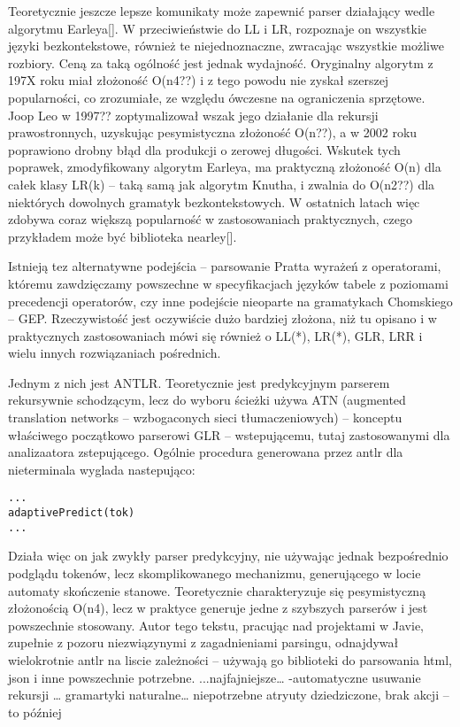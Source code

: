 Teoretycznie jeszcze lepsze komunikaty może zapewnić parser działający wedle algorytmu Earleya[]. W przeciwieństwie do LL i LR, rozpoznaje on wszystkie języki bezkontekstowe, również te niejednoznaczne, zwracając wszystkie możliwe rozbiory. Ceną za taką ogólność jest jednak wydajność. Oryginalny algorytm z 197X roku miał złożoność O(n4??) i z tego powodu nie zyskał szerszej popularności, co zrozumiałe, ze względu ówczesne na ograniczenia sprzętowe. Joop Leo w 1997?? zoptymalizował wszak jego działanie dla rekursji prawostronnych, uzyskując pesymistyczna złożoność O(n??), a w 2002 roku poprawiono drobny błąd dla produkcji o zerowej długości. Wskutek tych poprawek, zmodyfikowany algorytm Earleya, ma praktyczną złożoność O(n) dla całek klasy LR(k) – taką samą jak algorytm Knutha, i zwalnia do O(n2??) dla niektórych dowolnych gramatyk bezkontekstowych. W ostatnich latach więc zdobywa coraz większą popularność w zastosowaniach praktycznych, czego przykładem może być biblioteka nearley[].

Istnieją tez alternatywne podejścia – parsowanie Pratta wyrażeń z operatorami, któremu zawdzięczamy powszechne w specyfikacjach języków tabele z poziomami precedencji operatorów, czy inne podejście nieoparte na gramatykach Chomskiego – GEP. Rzeczywistość jest oczywiście dużo bardziej złożona, niż tu opisano i w praktycznych zastosowaniach mówi się również o LL(*), LR(*), GLR, LRR i wielu innych rozwiązaniach pośrednich.

Jednym z nich jest ANTLR. Teoretycznie jest predykcyjnym parserem rekursywnie schodzącym, lecz do wyboru ścieżki używa ATN (augmented translation networks – wzbogaconych sieci tłumaczeniowych) – konceptu właściwego początkowo parserowi GLR – wstepującemu, tutaj zastosowanymi dla analizaatora zstepującego.
Ogólnie procedura generowana przez antlr dla nieterminala wyglada nastepująco:
\begin{lstlisting}
...
adaptivePredict(tok)
...
\end{lstlisting}
Działa więc on jak zwykły parser predykcyjny, nie używając jednak bezpośrednio podglądu tokenów, lecz skomplikowanego mechanizmu, generującego w locie automaty skończenie stanowe. Teoretycznie charakteryzuje się pesymistyczną złożonością O(n4), lecz w praktyce generuje jedne z szybszych parserów i jest powszechnie stosowany. Autor tego tekstu, pracując nad projektami w Javie, zupełnie z pozoru niezwiązynymi z zagadnieniami parsingu, odnajdywał wielokrotnie antlr na liscie zależności – używają go biblioteki do parsowania html, json i inne powszechnie potrzebne.
...najfajniejsze… -automatyczne usuwanie rekursji
… gramartyki naturalne… niepotrzebne atryuty dziedziczone, brak akcji – to później

